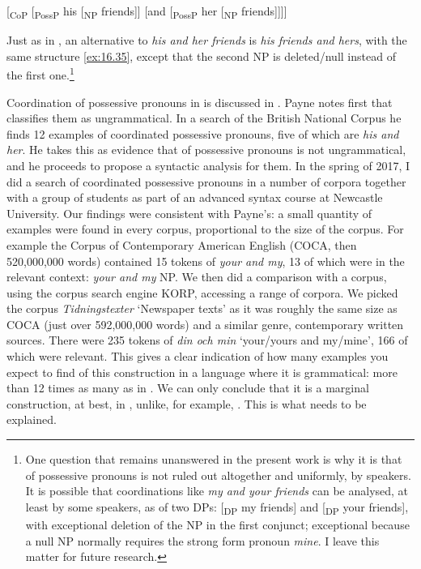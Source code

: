 \documentclass[output=paper]{langsci/langscibook}
\begin{document}
\ea\label{ex:16.35}
{}[\textsubscript{CoP} [\textsubscript{PossP} his [\textsubscript{NP} friends]] [and [\textsubscript{PossP} her [\textsubscript{NP} friends]]]]
\z

Just as in , an alternative to \emph{his and her friends} is \emph{his
friends and hers}, with the same structure \eqref{ex:16.35}, except that the second NP is
deleted/null instead of the first one.\footnote{ One question that remains
unanswered in the present work is why it is that  of possessive
pronouns is not ruled out altogether and uniformly, by  speakers. It is
possible that coordinations like \emph{my and your friends} can be analysed, at
least by some speakers, as  of two DPs: [\textsubscript{DP} my
friends] and [\textsubscript{DP} your friends], with exceptional deletion of
the NP in the first conjunct; exceptional because a null NP normally requires
the strong form pronoun \emph{mine}. I leave this matter for future research.}

Coordination of possessive pronouns in  is discussed in
\citet{Payne2011}. Payne notes first that \textcite{QuirkEtAl1972} classifies them as
ungrammatical. In a search of the British National Corpus he finds 12 examples
of coordinated possessive pronouns, five of which are \emph{his and her}. He
takes this as evidence that  of possessive pronouns is not
ungrammatical, and he proceeds to propose a syntactic analysis for them. In the
spring of 2017, I did a search of coordinated possessive pronouns in a number
of  corpora together with a group of students as part of an advanced
syntax course at Newcastle University. Our findings were consistent with
Payne’s: a small quantity of examples were found in every corpus, proportional
to the size of the corpus. For example the Corpus of Contemporary American
English (COCA, then 520,000,000 words) contained 15 tokens of \emph{your and
my}, 13 of which were in the relevant context: \emph{your and my} NP. We then
did a comparison with a  corpus, using the corpus search engine KORP,
accessing a range of  corpora. We picked the corpus
\emph{Tidningstexter} `Newspaper texts' as it was roughly the same size as COCA
(just over 592,000,000 words) and a similar genre, contemporary written
sources. There were 235 tokens of \emph{din och min} `your/yours and my/mine',
166 of which were relevant. This gives a clear indication of how many examples
you expect to find of this construction in a language where it is grammatical:
more than 12 times as many as in . We can only conclude that it is a
marginal construction, at best, in , unlike, for example, . This
is what needs to be explained.
\end{document}
